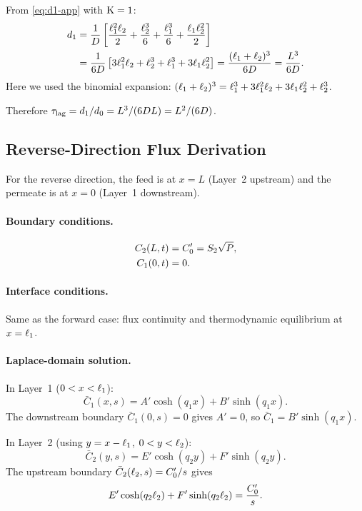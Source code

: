 From \cref{eq:d1-app} with $\mathrm{K} = 1$:
\begin{align}
  d_1 &= \frac{1}{D}\left[\frac{\ell_{1}^2\ell_{2}}{2}
    + \frac{\ell_{2}^3}{6} + \frac{\ell_{1}^3}{6}
    + \frac{\ell_{1}\ell_{2}^2}{2}\right]
  \notag\\
  &= \frac{1}{6D}\left[3\ell_{1}^2\ell_{2} + \ell_{2}^3
    + \ell_{1}^3 + 3\ell_{1}\ell_{2}^2\right]
  = \frac{(\ell_{1}+\ell_{2})^3}{6D} = \frac{L^3}{6D}.
\end{align}
Here we used the binomial expansion:
$(\ell_{1}+\ell_{2})^3 = \ell_{1}^3 + 3\ell_{1}^2\ell_{2} + 3\ell_{1}\ell_{2}^2
+ \ell_{2}^3$.

Therefore $\tau_{\mathrm{lag}} = d_1/d_0 = L^3/(6DL) = L^2/(6D)$.  \checkmark

\subsection{Reverse-Direction Flux Derivation}
\label{sec:app-reverse}

For the reverse direction, the feed is at $x = L$ (Layer~2 upstream) and the
permeate is at $x = 0$ (Layer~1 downstream).

\paragraph{Boundary conditions.}
\begin{align}
  C_2(L,t) &= C_0' = S_{2}\sqrt{P},\\
  C_1(0,t) &= 0.
\end{align}

\paragraph{Interface conditions.} Same as the forward case:
flux continuity and thermodynamic equilibrium at $x = \ell_{1}$.

\paragraph{Laplace-domain solution.}
In Layer~1 ($0 < x < \ell_{1}$):
\begin{equation}
  \bar{C}_1(x,s) = A'\cosh(q_1 x) + B'\sinh(q_1 x).
\end{equation}
The downstream boundary $\bar{C}_1(0,s) = 0$ gives $A' = 0$, so
$\bar{C}_1 = B'\sinh(q_1 x)$.

In Layer~2 (using $y = x - \ell_{1}$, $0 < y < \ell_{2}$):
\begin{equation}
  \bar{C}_2(y,s) = E'\cosh(q_2 y) + F'\sinh(q_2 y).
\end{equation}
The upstream boundary $\bar{C}_2(\ell_{2},s) = C_0'/s$ gives
\begin{equation}
  \label{eq:rev-bc-up}
  E'\cosh(q_2\ell_{2}) + F'\sinh(q_2\ell_{2}) = \frac{C_0'}{s}.
\end{equation}

